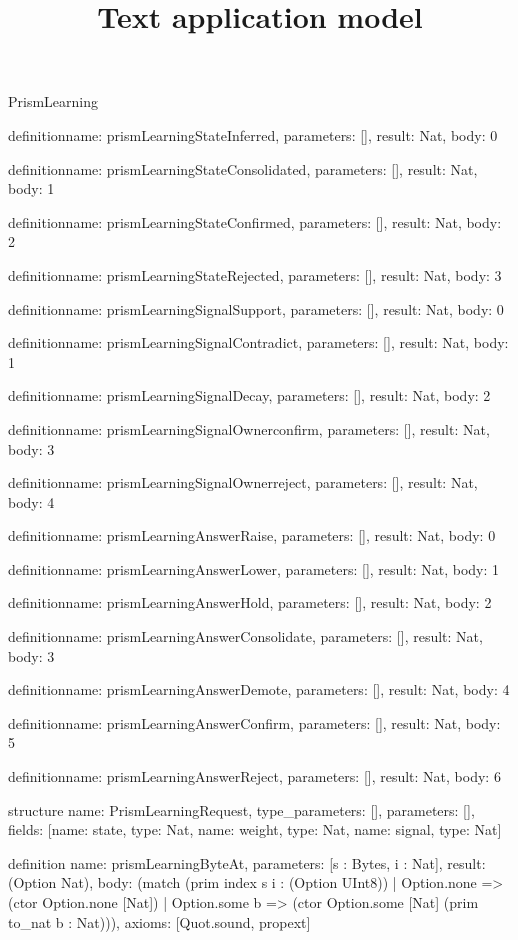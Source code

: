 \begin{lexlean}{PrismLearning}
\title{Text application model}
\begin{semanticmodule}
definition{name: prismLearningStateInferred, parameters: [], result: Nat, body: 0}

definition{name: prismLearningStateConsolidated, parameters: [], result: Nat, body: 1}

definition{name: prismLearningStateConfirmed, parameters: [], result: Nat, body: 2}

definition{name: prismLearningStateRejected, parameters: [], result: Nat, body: 3}

definition{name: prismLearningSignalSupport, parameters: [], result: Nat, body: 0}

definition{name: prismLearningSignalContradict, parameters: [], result: Nat, body: 1}

definition{name: prismLearningSignalDecay, parameters: [], result: Nat, body: 2}

definition{name: prismLearningSignalOwnerconfirm, parameters: [], result: Nat, body: 3}

definition{name: prismLearningSignalOwnerreject, parameters: [], result: Nat, body: 4}

definition{name: prismLearningAnswerRaise, parameters: [], result: Nat, body: 0}

definition{name: prismLearningAnswerLower, parameters: [], result: Nat, body: 1}

definition{name: prismLearningAnswerHold, parameters: [], result: Nat, body: 2}

definition{name: prismLearningAnswerConsolidate, parameters: [], result: Nat, body: 3}

definition{name: prismLearningAnswerDemote, parameters: [], result: Nat, body: 4}

definition{name: prismLearningAnswerConfirm, parameters: [], result: Nat, body: 5}

definition{name: prismLearningAnswerReject, parameters: [], result: Nat, body: 6}

structure{
  name: PrismLearningRequest,
  type_parameters: [],
  parameters: [],
  fields: [{name: state, type: Nat}, {name: weight, type: Nat}, {name: signal, type: Nat}]
}

definition{
  name: prismLearningByteAt,
  parameters: [s : Bytes, i : Nat],
  result: (Option Nat),
  body: (match (prim index s i : (Option UInt8))
    | Option.none => (ctor Option.none [Nat])
    | Option.some b => (ctor Option.some [Nat] (prim to_nat b : Nat))),
  axioms: [Quot.sound, propext]
}


\end{semanticmodule}
\end{lexlean}

